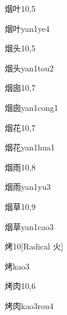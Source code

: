 \begin{entry}{烟叶}{10,5}
  \begin{phonetics}{烟叶}{yan1ye4}
  \end{phonetics}
\end{entry}

\begin{entry}{烟头}{10,5}
  \begin{phonetics}{烟头}{yan1tou2}
  \end{phonetics}
\end{entry}

\begin{entry}{烟囱}{10,7}
  \begin{phonetics}{烟囱}{yan1cong1}
  \end{phonetics}
\end{entry}

\begin{entry}{烟花}{10,7}
  \begin{phonetics}{烟花}{yan1hua1}
  \end{phonetics}
\end{entry}

\begin{entry}{烟雨}{10,8}
  \begin{phonetics}{烟雨}{yan1yu3}
  \end{phonetics}
\end{entry}

\begin{entry}{烟草}{10,9}
  \begin{phonetics}{烟草}{yan1cao3}
  \end{phonetics}
\end{entry}

\begin{entry}{烤}{10}[Radical 火]
  \begin{phonetics}{烤}{kao3}
  \end{phonetics}
\end{entry}

\begin{entry}{烤肉}{10,6}
  \begin{phonetics}{烤肉}{kao3rou4}
  \end{phonetics}
\end{entry}

